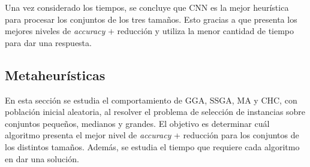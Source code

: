 Una vez considerado los tiempos, se concluye que CNN es la mejor heurística para procesar los conjuntos de los tres tamaños. Esto gracias a que presenta los mejores niveles de \emph{accuracy} + reducción y utiliza la menor cantidad de tiempo para dar una respuesta. 


\subsection{Metaheurísticas}

En esta sección se estudia el comportamiento de GGA, SSGA, MA y CHC, con población inicial aleatoria, al resolver el problema de selección de instancias sobre conjuntos pequeños, medianos y grandes. El objetivo es determinar cuál algoritmo presenta el mejor nivel de \emph{accuracy} + reducción para los conjuntos de los distintos tamaños. Además, se estudia el tiempo que requiere cada algoritmo en dar una solución.



